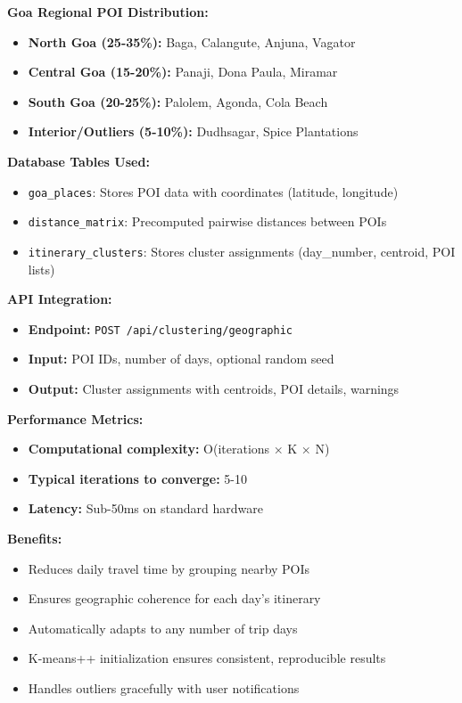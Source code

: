 \textbf{Goa Regional POI Distribution:}
\begin{itemize}
    \item \textbf{North Goa (25-35\%):} Baga, Calangute, Anjuna, Vagator
    \item \textbf{Central Goa (15-20\%):} Panaji, Dona Paula, Miramar
    \item \textbf{South Goa (20-25\%):} Palolem, Agonda, Cola Beach
    \item \textbf{Interior/Outliers (5-10\%):} Dudhsagar, Spice Plantations
\end{itemize}

\textbf{Database Tables Used:}
\begin{itemize}
    \item \texttt{goa\_places}: Stores POI data with coordinates (latitude, longitude)
    \item \texttt{distance\_matrix}: Precomputed pairwise distances between POIs
    \item \texttt{itinerary\_clusters}: Stores cluster assignments (day\_number, centroid, POI lists)
\end{itemize}

\textbf{API Integration:}
\begin{itemize}
    \item \textbf{Endpoint:} \texttt{POST /api/clustering/geographic}
    \item \textbf{Input:} POI IDs, number of days, optional random seed
    \item \textbf{Output:} Cluster assignments with centroids, POI details, warnings
\end{itemize}

\textbf{Performance Metrics:}
\begin{itemize}
    \item \textbf{Computational complexity:} O(iterations × K × N)
    \item \textbf{Typical iterations to converge:} 5-10
    \item \textbf{Latency:} Sub-50ms on standard hardware
\end{itemize}

\textbf{Benefits:}
\begin{itemize}
    \item Reduces daily travel time by grouping nearby POIs
    \item Ensures geographic coherence for each day's itinerary
    \item Automatically adapts to any number of trip days
    \item K-means++ initialization ensures consistent, reproducible results
    \item Handles outliers gracefully with user notifications
\end{itemize}
